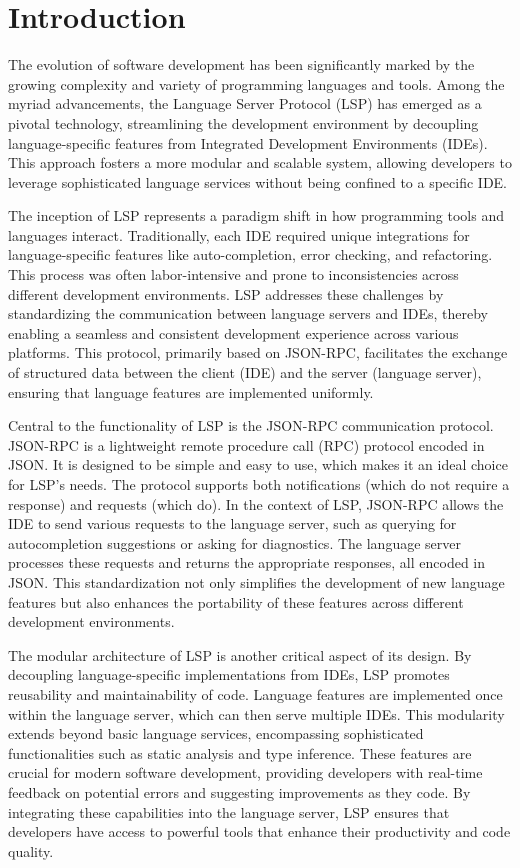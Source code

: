 \chapter{Introduction}\label{chap:Introduction}

The evolution of software development has been significantly marked by the growing complexity and variety of programming languages and tools. Among the myriad advancements, the Language Server Protocol (LSP) has emerged as a pivotal technology, streamlining the development environment by decoupling language-specific features from Integrated Development Environments (IDEs). This approach fosters a more modular and scalable system, allowing developers to leverage sophisticated language services without being confined to a specific IDE.

The inception of LSP represents a paradigm shift in how programming tools and languages interact. Traditionally, each IDE required unique integrations for language-specific features like auto-completion, error checking, and refactoring. This process was often labor-intensive and prone to inconsistencies across different development environments. LSP addresses these challenges by standardizing the communication between language servers and IDEs, thereby enabling a seamless and consistent development experience across various platforms. This protocol, primarily based on JSON-RPC, facilitates the exchange of structured data between the client (IDE) and the server (language server), ensuring that language features are implemented uniformly.

Central to the functionality of LSP is the JSON-RPC communication protocol. JSON-RPC is a lightweight remote procedure call (RPC) protocol encoded in JSON. It is designed to be simple and easy to use, which makes it an ideal choice for LSP's needs. The protocol supports both notifications (which do not require a response) and requests (which do). In the context of LSP, JSON-RPC allows the IDE to send various requests to the language server, such as querying for autocompletion suggestions or asking for diagnostics. The language server processes these requests and returns the appropriate responses, all encoded in JSON. This standardization not only simplifies the development of new language features but also enhances the portability of these features across different development environments.

The modular architecture of LSP is another critical aspect of its design. By decoupling language-specific implementations from IDEs, LSP promotes reusability and maintainability of code. Language features are implemented once within the language server, which can then serve multiple IDEs. This modularity extends beyond basic language services, encompassing sophisticated functionalities such as static analysis and type inference. These features are crucial for modern software development, providing developers with real-time feedback on potential errors and suggesting improvements as they code. By integrating these capabilities into the language server, LSP ensures that developers have access to powerful tools that enhance their productivity and code quality.

